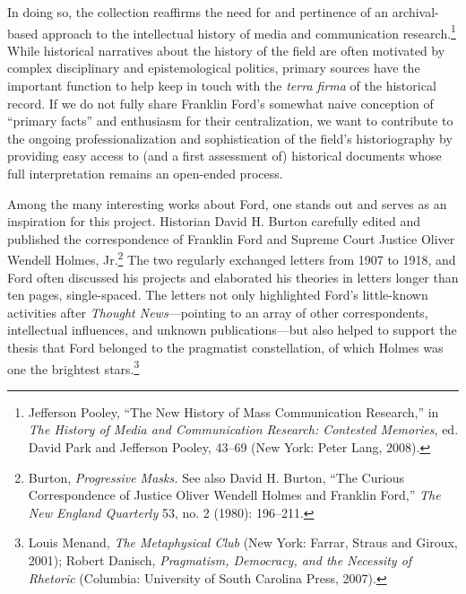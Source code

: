 \documentclass[openany,nobib]{tufte-book}
\begin{document}
In doing so, the collection reaffirms the need for and pertinence of an
archival-based approach to the intellectual history of media and
communication research.\footnote{Jefferson Pooley, ``The New History of
  Mass Communication Research,'' in \emph{The History of Media and
  Communication Research: Contested Memories}, ed. David Park and
  Jefferson Pooley, 43--69 (New York: Peter Lang, 2008).} While
historical narratives about the history of the field are often motivated
by complex disciplinary and epistemological politics, primary sources
have the important function to help keep in touch with the \emph{terra
firma} of the historical record. If we do not fully share Franklin
Ford's somewhat naive conception of ``primary facts'' and enthusiasm for
their centralization, we want to contribute to the ongoing
professionalization and sophistication of the field's historiography by
providing easy access to (and a first assessment of) historical
documents whose full interpretation remains an open-ended process.

Among the many interesting works about Ford, one stands out and serves
as an inspiration for this project. Historian David H. Burton carefully
edited and published the correspondence of Franklin Ford and Supreme
Court Justice Oliver Wendell Holmes, Jr.\footnote{Burton,
  \emph{Progressive Masks.} See also David H. Burton, ``The Curious
  Correspondence of Justice Oliver Wendell Holmes and Franklin Ford,''
  \emph{The New England Quarterly} 53, no. 2 (1980): 196--211.} The two
regularly exchanged letters from 1907 to 1918, and Ford often discussed
his projects and elaborated his theories in letters longer than ten
pages, single-spaced. The letters not only highlighted Ford's
little-known activities after \emph{Thought News}---pointing to an array
of other correspondents, intellectual influences, and unknown
publications---but also helped to support the thesis that Ford belonged
to the pragmatist constellation, of which Holmes was one the brightest
stars.\footnote{Louis Menand, \emph{The Metaphysical Club} (New York:
  Farrar, Straus and Giroux, 2001); Robert Danisch, \emph{Pragmatism,
  Democracy, and the Necessity of Rhetoric} (Columbia: University of
  South Carolina Press, 2007).}
\end{document}
